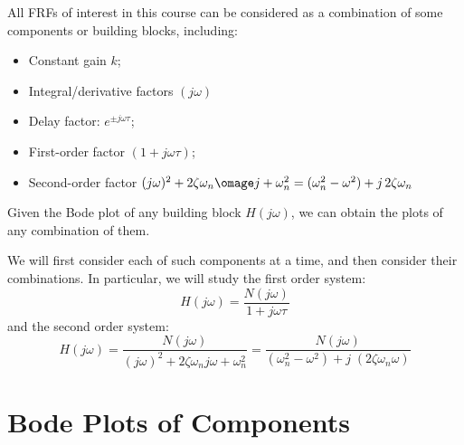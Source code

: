 All FRFs of interest in this course can be considered as a combination of 
some components or building blocks, including:
\begin{itemize}
  \item Constant gain $k$;
  \item Integral/derivative factors $(j\omega)$
  \item Delay factor: $e^{\pm j\omega \tau}$;
  \item First-order factor $(1+j\omega\tau)$;
  \item Second-order factor 
    $(j\omega)^2+2\zeta\omega_n\omage j+\omega_n^2
    =(\omega_n^2-\omega^2)+j\,2\zeta\omega_n$
\end{itemize}
Given the Bode plot of any building block $H(j\omega)$, we can obtain the plots
of any combination of them.

We will first consider each of such components at a time, and then consider 
their combinations. In particular, we will study the first order system:
\[ H(j\omega)=\frac{N(j\omega)}{1+j\omega \tau} \]
and the second order system:
\[ H(j\omega)=\frac{N(j\omega)}{(j\omega)^2+2\zeta\omega_n j\omega +\omega_n^2}
=\frac{N(j\omega)}{(\omega_n^2-\omega^2)+j\;(2\zeta\omega_n \omega) }\]

\section*{Bode Plots of Components}

